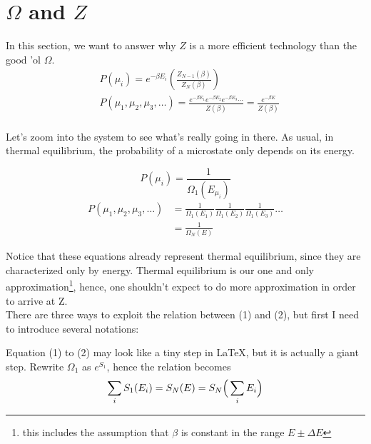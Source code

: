 




    \section{\mathsection $\Omega$ and $Z$}
    \newcommand{\ThE}{thermal equilibrium}
        
        In this section, we want to answer why $Z$ is a more efficient technology than the good 'ol $\Omega$.
        \begin{align*}
            &P(\mu_i) = e^{-\beta E_i}
            \left( \frac{Z_{N-1}(\beta)}{Z_N(\beta)}\right)\\
            &P(\mu_1,\mu_2,\mu_3,\ldots) = \frac{e^{-\beta E_1} e^{-\beta E_2} e^{-\beta E_3} \cdots}{Z(\beta)}
                              = \frac{e^{-\beta E} }{Z(\beta)}\\
        \end{align*}

        Let's zoom into the system to see what's really going in there.
        As usual, in \ThE, the probability of a microstate only depends on its energy.

            \[P(\mu_i) = \frac1{\Omega_1(E_{\mu_i})} \]
        \begin{align}
            P(\mu_1,\mu_2,\mu_3,\ldots) &= \frac1{\Omega_1(E_1)}
                                \frac1{\Omega_1(E_2)}
                                \frac1{\Omega_1(E_3)}
                                \ldots \\
            &= \frac1{\Omega_N(E)}
        \end{align}

        Notice that these equations already represent thermal equilibrium,
        since they are characterized only by energy.
        Thermal equilibrium is our one and only approximation\footnote{this includes the assumption that $\beta$ is constant in the range $E\pm\Delta E$},
        hence, one shouldn't expect to do more approximation in order to arrive at Z.\\
        There are three ways to exploit the relation between (1) and (2), but first I need to introduce several notations:

        \newcommand{\aE}{\epsilon}
        \newcommand{\soi}{\sum_i}
        \newcommand{\Stothei}[1] {{\hat\pdc}^{#1} S_1(\aE)}
        Equation (1) to (2) may look like a tiny step in \LaTeX,
        but it is actually a giant step.
        Rewrite $\Omega_1$ as $e^{ S_1}$, hence the relation becomes
        \begin{equation}
            \label{eq:mainassumption}
            \soi S_1(E_i) = S_N(E) = S_N\Big(\soi E_i\Big) \\
        \end{equation}


